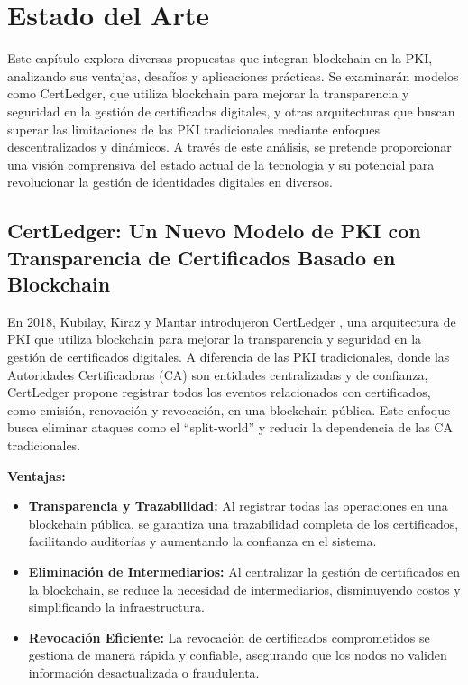 \chapter{Estado del Arte}

Este capítulo explora diversas propuestas que integran blockchain en la PKI, analizando sus ventajas, desafíos y aplicaciones prácticas. Se examinarán modelos como CertLedger, que utiliza blockchain para mejorar la transparencia y seguridad en la gestión de certificados digitales, y otras arquitecturas que buscan superar las limitaciones de las PKI tradicionales mediante enfoques descentralizados y dinámicos. A través de este análisis, se pretende proporcionar una visión comprensiva del estado actual de la tecnología y su potencial para revolucionar la gestión de identidades digitales en diversos.

\section{CertLedger: Un Nuevo Modelo de PKI con Transparencia de Certificados Basado en Blockchain}

En 2018, Kubilay, Kiraz y Mantar introdujeron CertLedger \cite{Kubilay2018}, una arquitectura de PKI que utiliza blockchain para mejorar la transparencia y seguridad en la gestión de certificados digitales. A diferencia de las PKI tradicionales, donde las Autoridades Certificadoras (CA) son entidades centralizadas y de confianza, CertLedger propone registrar todos los eventos relacionados con certificados, como emisión, renovación y revocación, en una blockchain pública. Este enfoque busca eliminar ataques como el ``split-world'' y reducir la dependencia de las CA tradicionales.

\textbf{Ventajas:}

\begin{itemize}
  \item \textbf{Transparencia y Trazabilidad:} Al registrar todas las operaciones en una blockchain pública, se garantiza una trazabilidad completa de los certificados, facilitando auditorías y aumentando la confianza en el sistema.
  \item \textbf{Eliminación de Intermediarios:} Al centralizar la gestión de certificados en la blockchain, se reduce la necesidad de intermediarios, disminuyendo costos y simplificando la infraestructura.
  \item \textbf{Revocación Eficiente:} La revocación de certificados comprometidos se gestiona de manera rápida y confiable, asegurando que los nodos no validen información desactualizada o fraudulenta.
\end{itemize}

